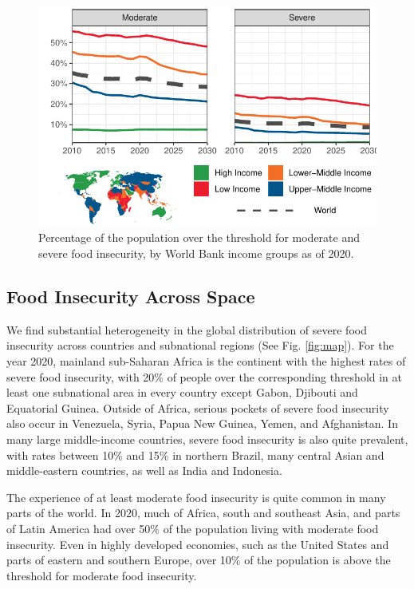 \documentclass{article}
\begin{document}
\begin{figure}[H]
  \centering
  \includegraphics[width=\linewidth]{img/Rates.pdf}
  \caption{Percentage of the population over the threshold for moderate and severe food insecurity, by World Bank income groups as of 2020.}
  \label{fig:rates}
\end{figure}


\subsection{Food Insecurity Across Space}
We find substantial heterogeneity in the global distribution of severe food insecurity across countries and subnational regions (See Fig. \ref{fig:map}).  For the year 2020, mainland sub-Saharan Africa is the continent with the highest rates of severe food insecurity, with 20\% of people over the corresponding threshold in at least one subnational area in every country except Gabon, Djibouti and Equatorial Guinea.  Outside of Africa, serious pockets of severe food insecurity also occur in Venezuela, Syria, Papua New Guinea, Yemen, and Afghanistan.  In many large middle-income countries, severe food insecurity is also quite prevalent, with rates between 10\% and 15\% in northern Brazil, many central Asian and middle-eastern countries, as well as India and Indonesia.

The experience of at least moderate food insecurity is quite common in many parts of the world.  In 2020, much of Africa, south and southeast Asia, and parts of Latin America had over 50\% of the population living with moderate food insecurity.  Even in highly developed economies, such as the United States and parts of eastern and southern Europe, over 10\% of the population is above the threshold for moderate food insecurity.
\end{document}
